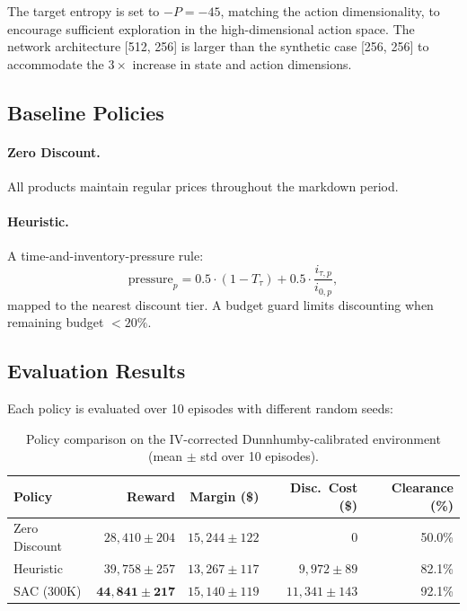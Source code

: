\documentclass[11pt,a4paper]{article}
\begin{document}
The target entropy is set to $-P = -45$, matching the action dimensionality, to encourage sufficient exploration in the high-dimensional action space.
The network architecture [512, 256] is larger than the synthetic case [256, 256] to accommodate the $3\times$ increase in state and action dimensions.

\subsection{Baseline Policies}

\paragraph{Zero Discount.}
All products maintain regular prices throughout the markdown period.

\paragraph{Heuristic.}
A time-and-inventory-pressure rule:
\begin{equation}
\text{pressure}_p = 0.5 \cdot (1 - T_\tau) + 0.5 \cdot \frac{i_{\tau,p}}{i_{0,p}},
\end{equation}
mapped to the nearest discount tier.
A budget guard limits discounting when remaining budget $< 20\%$.

\subsection{Evaluation Results}

Each policy is evaluated over 10 episodes with different random seeds:

\begin{table}[H]
\centering
\caption{Policy comparison on the IV-corrected Dunnhumby-calibrated environment (mean $\pm$ std over 10 episodes).}
\begin{tabular}{@{}lrrrr@{}}
\toprule
\textbf{Policy} & \textbf{Reward} & \textbf{Margin (\$)} & \textbf{Disc.\ Cost (\$)} & \textbf{Clearance (\%)} \\
\midrule
Zero Discount & $28{,}410 \pm 204$ & $15{,}244 \pm 122$ & $0$ & 50.0\% \\
Heuristic & $39{,}758 \pm 257$ & $13{,}267 \pm 117$ & $9{,}972 \pm 89$ & 82.1\% \\
SAC (300K) & $\mathbf{44{,}841 \pm 217}$ & $15{,}140 \pm 119$ & $11{,}341 \pm 143$ & 92.1\% \\
\bottomrule
\end{tabular}
\end{table}
\end{document}
